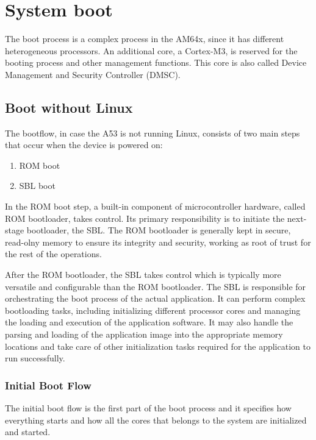 \section{System boot}

The boot process is a complex process in the AM64x, since it has different
heterogeneous processors. An additional core, a Cortex-M3, is reserved for the
booting process and other management functions. This core is also called
Device Management and Security Controller (DMSC).

\subsection{Boot without Linux}

The bootflow, in case the A53 is not running Linux, consists of two main steps
that occur when the device is powered on:

\begin{enumerate}
    \item   ROM boot
    \item   SBL boot
\end{enumerate}

In the ROM boot step, a built-in component of microcontroller hardware, called
ROM bootloader, takes control. Its primary responsibility is to initiate the
next-stage bootloader, the SBL.
The ROM bootloader is generally kept in secure, read-olny memory to ensure its
integrity and security, working as root of trust for the rest of the operations.

After the ROM bootloader, the SBL takes control which is typically more
versatile and configurable than the ROM bootloader.
The SBL is responsible for orchestrating the boot process of the actual
application.
It can perform complex bootloading tasks, including initializing different
processor cores and managing the loading and execution of the application
software. It may also handle the parsing and loading of the application image
into the appropriate memory locations and take care of other initialization
tasks required for the application to run successfully.

\subsubsection{Initial Boot Flow}

The initial boot flow is the first part of the boot process and it specifies
how everything starts and how all the cores that belongs to the system are
initialized and started.

